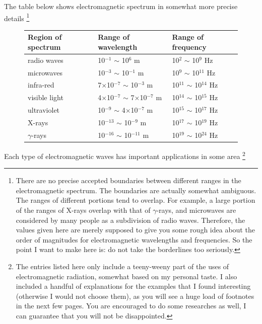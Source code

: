 The table below shows electromagnetic spectrum in somewhat more precise details \footnote[][-2cm]{There are no precise accepted boundaries between different ranges in the electromagnetic spectrum. The boundaries are actually somewhat ambiguous. The ranges of different portions tend to overlap. For example, a large portion of the ranges of X-rays overlap with that of $\gamma$-rays, and microwaves are considered by many people as a subdivision of radio waves. Therefore, the values given here are merely supposed to give you some rough idea about the order of magnitudes for electromagnetic wavelengths and frequencies. So the point I want to make here is: do not take the borderlines too seriously.}
\vspace{3cm}
\begin{figure}
\begin{center}
	\begin{tabular}{|C{4cm}|C{4cm}|C{4cm}|}
		\hline Region of spectrum & Range of wavelength & Range of frequency \\ 
		\hline radio waves  & 10$^{-1}$ $\sim$ 10$^{6}$ m & 10$^{2}$ $\sim$ 10$^{9}$ Hz \\ 
		\hline microwaves & 10$^{-3}$ $\sim$ 10$^{-1}$ m & 10$^{9}$ $\sim$ 10$^{11}$ Hz \\ 
		\hline infra-red & 7$\times$10$^{-7}$ $\sim$ 10$^{-3}$ m & 10$^{11}$ $\sim$ 10$^{14}$ Hz \\ 
		\hline visible light  & 4$\times$10$^{-7}$ $\sim$ 7$\times$10$^{-7}$ m & 10$^{14}$ $\sim$ 10$^{15}$ Hz \\ 
		\hline ultraviolet & 10$^{-9}$ $\sim$ 4$\times$10$^{-7}$ m & 10$^{15}$ $\sim$ 10$^{17}$ Hz \\ 
		\hline X-rays & 10$^{-13}$ $\sim$ 10$^{-9}$ m & 10$^{17}$ $\sim$ 10$^{19}$ Hz \\ 
		\hline $\gamma$-rays & 10$^{-16}$ $\sim$ 10$^{-11}$ m & 10$^{19}$ $\sim$ 10$^{24}$ Hz\\ 
		\hline
	\end{tabular} 
\end{center}
\end{figure}

Each type of electromagnetic waves has important applications in some area
\footnote{The entries listed here only include a teeny-weeny part of the uses of electromagnetic radiation, somewhat based on my personal taste. I also included a handful of explanations for the examples that I found interesting (otherwise I would not choose them), as you will see a huge load of footnotes in the next few pages. You are encouraged to do some researches as well, I can guarantee that you will not be disappointed.}

